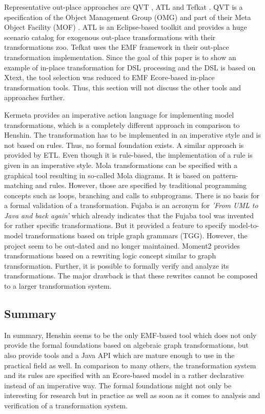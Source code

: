 \documentclass[runningheads]{llncs}
\begin{document}
Representative out-place approaches are QVT \cite{qvt}, ATL \cite{atl} and Tefkat \cite{tefkat}. QVT \cite{qvt} is a specification of the Object Management Group (OMG) and part of their Meta Object Facility (MOF) \cite{mof}. ATL \cite{atl} is an Eclipse-based toolkit and provides a huge scenario catalog for exogenous out-place transformations with their transformations zoo. Tefkat \cite{tefkat} uses the EMF framework in their out-place transformation implementation. Since the goal of this paper is to show an example of in-place transformation for DSL processing and the DSL is based on Xtext, the tool selection was reduced to EMF Ecore-based in-place transformation tools. Thus, this section will not discuss the other tools and approaches further.

Kermeta provides an imperative action language for implementing model transformations, which is a completely different approach in comparison to Henshin. The transformation has to be implemented in an imperative style and is not based on rules. Thus, no formal foundation exists. A similar approach is provided by ETL. Even though it is rule-based, the implementation of a rule is given in an imperative style. Mola transformations can be specified with a graphical tool resulting in so-called Mola diagrams. It is based on pattern-matching and rules. However, those are specified by traditional programming concepts such as loops, branching and calls to subprograms. There is no basis for a formal validation of a transformation. Fujaba is an acronym for \textit{'From UML to Java and back again'} which already indicates that the Fujaba tool was invented for rather specific transformations. But it provided a feature to specify model-to-model transformations based on triple graph grammars (TGG). However, the project seem to be out-dated and no longer maintained. Moment2 provides transformations based on a rewriting logic concept similar to graph transformation. Further, it is possible to formally verify and analyze its transformations. The major drawback is that these rewrites cannot be composed to a larger transformation system.

\subsection{Summary}
In summary, Henshin seems to be the only EMF-based tool which does not only provide the formal foundations based on algebraic graph transformations, but also provide tools and a Java API which are mature enough to use in the practical field as well. In comparison to many others, the transformation system and its rules are specified with an Ecore-based model in a rather declarative instead of an imperative way. The formal foundations might not only be interesting for research but in practice as well as soon as it comes to analysis and verification of a transformation system.
\end{document}

